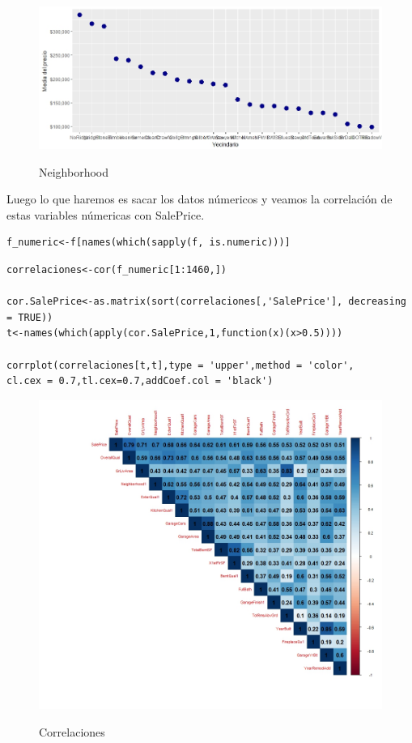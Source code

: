 \documentclass{report}
\begin{document}
\begin{itemize}
\newpage

\begin{figure}[h]
	\centering
	\includegraphics[scale=0.75]{Vecindario.JPEG}
	\label{p1}
	\caption{Neighborhood}
\end{figure}

Luego lo que haremos es sacar los datos númericos y veamos la correlación de estas variables númericas con SalePrice.\\

\begin{lstlisting}[frame=single]
f_numeric<-f[names(which(sapply(f, is.numeric)))]
\end{lstlisting}

\begin{lstlisting}[frame=single]
correlaciones<-cor(f_numeric[1:1460,])

cor.SalePrice<-as.matrix(sort(correlaciones[,'SalePrice'], decreasing = TRUE))
t<-names(which(apply(cor.SalePrice,1,function(x)(x>0.5))))

corrplot(correlaciones[t,t],type = 'upper',method = 'color',
cl.cex = 0.7,tl.cex=0.7,addCoef.col = 'black')
\end{lstlisting}
  
 \newpage
  
\begin{figure}[h]
	\centering
	\includegraphics[scale=0.65]{Correlaciones.JPEG}
	\label{p1}
	\caption{Correlaciones}
\end{figure}


\end{itemize}
\end{document}
